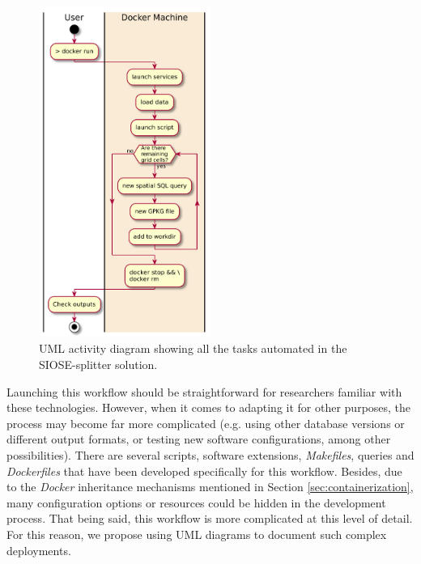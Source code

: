 \documentclass[ijgi,article,submit,moreauthors,pdftex]{Definitions/mdpi}
\begin{document}
\begin{figure}[!ht]
    \centering
    \includegraphics[width=0.5\textwidth]{images/siose-splitter-activity-diagram.pdf}
    \caption{UML activity diagram showing all the tasks automated in the SIOSE-splitter solution.}
    \label{fig:siose_splitter_workflow}
\end{figure}

Launching this workflow should be straightforward for researchers familiar with these technologies. However, when it comes to adapting it for other purposes, the process may become far more complicated (e.g. using other database versions or different output formats, or testing new software configurations, among other possibilities). There are several scripts, software extensions, \textit{Makefiles}, queries and \textit{Dockerfiles} that have been developed specifically for this workflow. Besides, due to the \textit{Docker} inheritance mechanisms mentioned in Section \ref{sec:containerization}, many configuration options or resources could be hidden in the development process. That being said, this workflow is more complicated at this level of detail. For this reason, we propose using UML diagrams to document such complex deployments.
\end{document}

